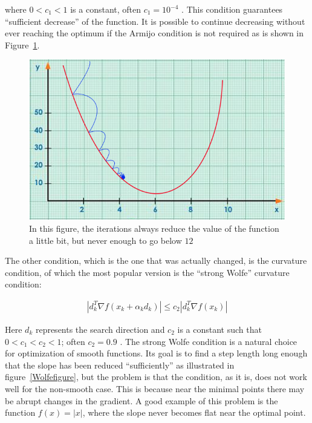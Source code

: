 where $0 < c_1 < 1$ is a constant, often $c_1 = 10^{-4}$ \citep{nocedal}. This condition guarantees ``sufficient decrease'' of the function. It is possible to continue decreasing without ever reaching the optimum if the Armijo condition is not required as is shown in Figure~\ref{armijograph}.

\begin{figure} 
\begin{center}
\includegraphics[scale=0.5]{Figures/armijo.png}
\caption[Representation of the Armijo Condition in a Nutshell]{In this figure, the iterations always reduce the value of the function a little bit, but never enough to go below $12$}
\label{armijograph}
\end{center}
\end{figure}

The other condition, which is the one that was actually changed, is the curvature condition, of which the most popular version is the ``strong Wolfe'' curvature condition:

\begin{equation} \label{strogWolfeq}
  \begin{aligned}
    |d_k^T \nabla f(x_k + \alpha _k d_k)| \leq c_2 |d_k^T \nabla f(x_k)|
  \end{aligned}
\end{equation}

Here $d_k$ represents the search direction and $c_2$ is a constant such that $0 < c_1 < c_2 < 1$; often $c_2 = 0.9$ \citep{nocedal}. The strong Wolfe condition is a natural choice for optimization of smooth functions. Its goal is to find a step length long enough that the slope has been reduced ``sufficiently'' as illustrated in figure~\eqref{Wolfefigure}, but the problem is that the condition, as it is, does not work well for the non-smooth case. This is because near the minimal points there may be abrupt changes in the gradient. A good example of this problem is the function $f(x) = |x|$, where the slope never becomes flat near the optimal point.


